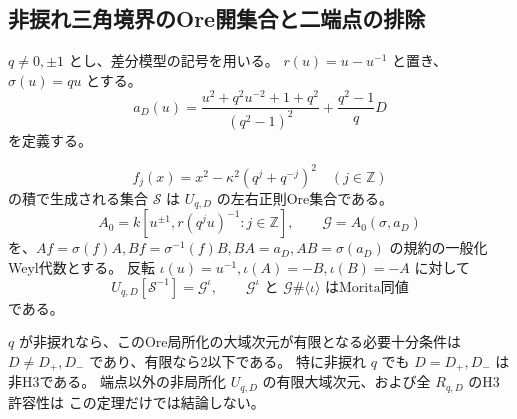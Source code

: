 \subsection{非捩れ三角境界のOre開集合と二端点の排除}
\label{subsec:quantum-triangle-gwa}
$q\ne0,\pm1$ とし、差分模型の記号を用いる。
$r(u)=u-u^{-1}$ と置き、$\sigma(u)=qu$ とする。
\[
 a_D(u)=\frac{u^2+q^2u^{-2}+1+q^2}{(q^2-1)^2}
          +\frac{q^2-1}{q}D
\]
を定義する。

\begin{theorem}[反転GWA模型と非捩れ端点の非許容性]
\label{thm:quantum-triangle-gwa}
\[
 f_j(x)=x^2-\kappa^2(q^j+q^{-j})^2\quad(j\in\mathbb Z)
\]
の積で生成される集合 $\mathcal S$ は $U_{q,D}$ の左右正則Ore集合である。
\[
 A_0=k[u^{\pm1},r(q^ju)^{-1}:j\in\mathbb Z],\qquad
 \mathcal G=A_0(\sigma,a_D)
\]
を、$Af=\sigma(f)A,Bf=\sigma^{-1}(f)B,BA=a_D,AB=\sigma(a_D)$
の規約の一般化Weyl代数とする。
反転 $\iota(u)=u^{-1},\iota(A)=-B,\iota(B)=-A$ に対して
\[
 U_{q,D}[\mathcal S^{-1}]=\mathcal G^{\iota},\qquad
 \mathcal G^{\iota}\text{ と }\mathcal G\#\langle\iota\rangle
 \text{ はMorita同値}
\]
である。

$q$ が非捩れなら、このOre局所化の大域次元が有限となる必要十分条件は
$D\ne D_+,D_-$ であり、有限なら2以下である。
特に非捩れ $q$ でも $D=D_+,D_-$ は非H3である。
端点以外の非局所化 $U_{q,D}$ の有限大域次元、および全 $R_{q,D}$ のH3許容性は
この定理だけでは結論しない。
\end{theorem}
